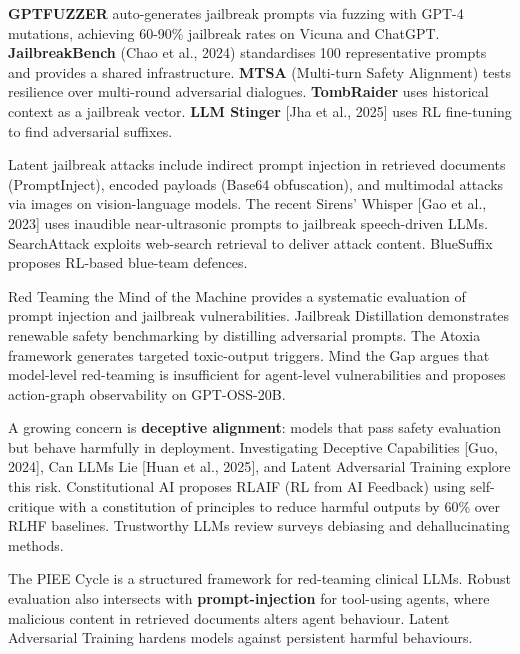 \documentclass{article}
\begin{document}
\textbf{GPTFUZZER} \cite{yu2023gptfuzzerredteamin} auto-generates jailbreak prompts via fuzzing with GPT-4 mutations, achieving 60-90\% jailbreak rates on Vicuna and ChatGPT. \textbf{JailbreakBench} (Chao et al., 2024) standardises 100 representative prompts and provides a shared infrastructure. \textbf{MTSA} (Multi-turn Safety Alignment) \cite{guo20252025} tests resilience over multi-round adversarial dialogues. \textbf{TombRaider} \cite{ding20252025} uses historical context as a jailbreak vector. \textbf{LLM Stinger} {[}Jha et al., 2025{]} uses RL fine-tuning to find adversarial suffixes.

Latent jailbreak attacks include indirect prompt injection in retrieved documents (PromptInject), encoded payloads (Base64 obfuscation), and multimodal attacks via images on vision-language models. The recent Sirens' Whisper {[}Gao et al., 2023{]} uses inaudible near-ultrasonic prompts to jailbreak speech-driven LLMs. SearchAttack \cite{yan20262026} exploits web-search retrieval to deliver attack content. BlueSuffix \cite{zhao20242024} proposes RL-based blue-team defences.

Red Teaming the Mind of the Machine \cite{pathade2025redteamingthemindo} provides a systematic evaluation of prompt injection and jailbreak vulnerabilities. Jailbreak Distillation \cite{zhang20252025} demonstrates renewable safety benchmarking by distilling adversarial prompts. The Atoxia framework \cite{du20242024} generates targeted toxic-output triggers. Mind the Gap \cite{wicaksono20252025} argues that model-level red-teaming is insufficient for agent-level vulnerabilities and proposes action-graph observability on GPT-OSS-20B.

A growing concern is \textbf{deceptive alignment}: models that pass safety evaluation but behave harmfully in deployment. Investigating Deceptive Capabilities {[}Guo, 2024{]}, Can LLMs Lie {[}Huan et al., 2025{]}, and Latent Adversarial Training \cite{sheshadri20242024} explore this risk. Constitutional AI \cite{bai20222022} proposes RLAIF (RL from AI Feedback) using self-critique with a constitution of principles to reduce harmful outputs by 60\% over RLHF baselines. Trustworthy LLMs review \cite{lin20242024} surveys debiasing and dehallucinating methods.

The PIEE Cycle \cite{trabilsy20252025} is a structured framework for red-teaming clinical LLMs. Robust evaluation also intersects with \textbf{prompt-injection} for tool-using agents, where malicious content in retrieved documents alters agent behaviour. Latent Adversarial Training \cite{sheshadri20242024} hardens models against persistent harmful behaviours.
\end{document}
